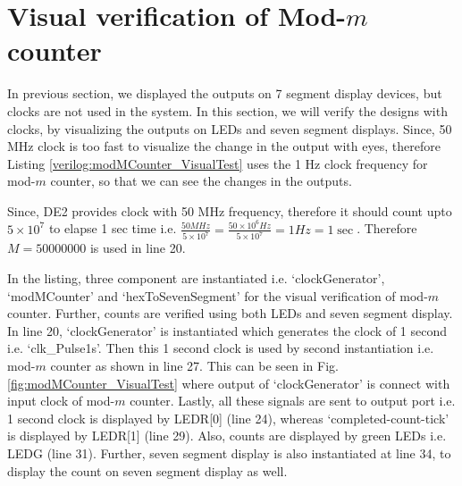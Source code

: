 


\section{Visual verification of Mod-$m$ counter}\label{sec:modMCounterVisualTest}
In previous section, we displayed the outputs on 7 segment display devices, but clocks are not used in the system. In this section, we will verify the designs with clocks, by visualizing the outputs on LEDs and seven segment displays. Since, 50 MHz clock is too fast to visualize the change in the output with eyes, therefore Listing \ref{verilog:modMCounter_VisualTest} uses the 1 Hz clock frequency for mod-$m$ counter, so that we can see the changes in the outputs. 

\begin{explanation}
	Since, DE2 provides clock with 50 MHz frequency, therefore it should count upto $5 \times 10^7$ to elapse 1 sec time i.e. $\frac{{50MHz}}{{5 \times {{10}^7}}} = \frac{{50 \times {{10}^6}Hz}}{{5 \times {{10}^7}}} = 1Hz = 1\sec $. Therefore $M=50000000$ is used in line 20.   
	
	In the listing, three component are instantiated i.e. `clockGenerator', `modMCounter' and `hexToSevenSegment' for the visual verification of mod-$m$ counter. Further, counts are verified using both LEDs and seven segment display. In line 20, `clockGenerator' is instantiated which generates the clock of 1 second i.e. `clk\_Pulse1s'. Then this 1 second clock is used by second instantiation i.e. mod-$m$ counter as shown in line 27. This can be seen in Fig. \ref{fig:modMCounter_VisualTest} where output of `clockGenerator' is connect with input clock of mod-$m$ counter. Lastly, all these signals are sent to output port i.e. 1 second clock is displayed by LEDR[0] (line 24), whereas `completed-count-tick' is displayed by LEDR[1] (line 29). Also, counts are displayed by green LEDs i.e. LEDG (line 31).  Further, seven segment display is also instantiated at line 34, to display the count on seven segment display as well. 
\end{explanation}



